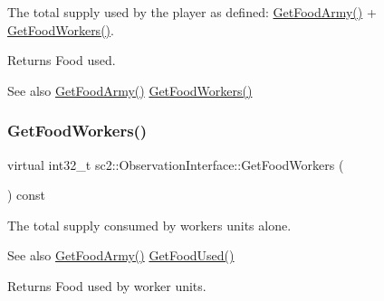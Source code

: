 The total supply used by the player as defined\+: \hyperlink{classsc2_1_1_observation_interface_a7fd13a2a776f08f714d941ba9e4bafa8}{Get\+Food\+Army()} + \hyperlink{classsc2_1_1_observation_interface_a19f0bdd8df647ee935dbe6f3c50d64e7}{Get\+Food\+Workers()}. \begin{DoxyReturn}{Returns}
Food used. 
\end{DoxyReturn}
\begin{DoxySeeAlso}{See also}
\hyperlink{classsc2_1_1_observation_interface_a7fd13a2a776f08f714d941ba9e4bafa8}{Get\+Food\+Army()} \hyperlink{classsc2_1_1_observation_interface_a19f0bdd8df647ee935dbe6f3c50d64e7}{Get\+Food\+Workers()} 
\end{DoxySeeAlso}
\mbox{\label{classsc2_1_1_observation_interface_a19f0bdd8df647ee935dbe6f3c50d64e7}} 
\subsubsection{\texorpdfstring{Get\+Food\+Workers()}{GetFoodWorkers()}}
{\footnotesize\ttfamily virtual int32\+\_\+t sc2\+::\+Observation\+Interface\+::\+Get\+Food\+Workers (\begin{DoxyParamCaption}{ }\end{DoxyParamCaption}) const\hspace{0.3cm}{\ttfamily [pure virtual]}}

The total supply consumed by workers units alone. \begin{DoxySeeAlso}{See also}
\hyperlink{classsc2_1_1_observation_interface_a7fd13a2a776f08f714d941ba9e4bafa8}{Get\+Food\+Army()} \hyperlink{classsc2_1_1_observation_interface_a77f230bd98b95599338c7788aee00d26}{Get\+Food\+Used()} 
\end{DoxySeeAlso}
\begin{DoxyReturn}{Returns}
Food used by worker units. 
\end{DoxyReturn}
\mbox{\label{classsc2_1_1_observation_interface_a7b73eb640b052409b0095609a8136102}} 
